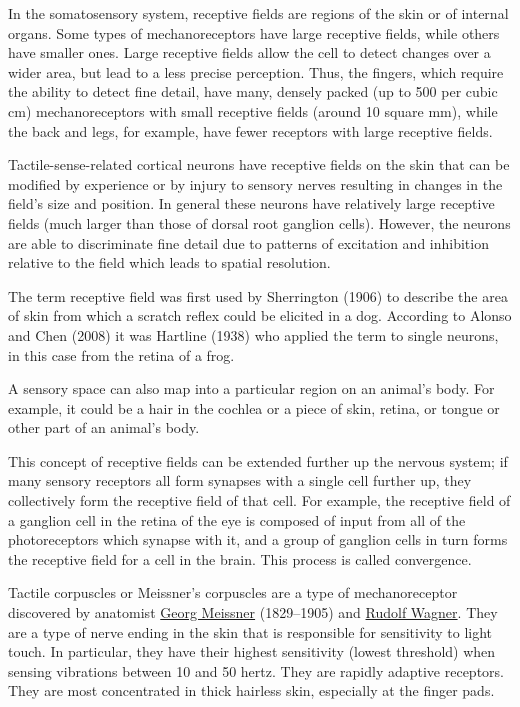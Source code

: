 In the somatosensory system, receptive fields are regions of the skin or of internal organs. Some types of mechanoreceptors have large receptive fields, while others have smaller ones. Large receptive fields allow the cell to detect changes over a wider area, but lead to a less precise perception. Thus, the fingers, which require the ability to detect fine detail, have many, densely packed (up to 500 per cubic cm) mechanoreceptors with small receptive fields (around 10 square mm), while the back and legs, for example, have fewer receptors with large receptive fields.

Tactile-sense-related cortical neurons have receptive fields on the skin that can be modified by experience or by injury to sensory nerves resulting in changes in the field's size and position. In general these neurons have relatively large receptive fields (much larger than those of dorsal root ganglion cells). However, the neurons are able to discriminate fine detail due to patterns of excitation and inhibition relative to the field which leads to spatial resolution.

The term receptive field was first used by Sherrington (1906) to describe the area of skin from which a scratch reflex could be elicited in a dog. According to Alonso and Chen (2008) it was Hartline (1938) who applied the term to single neurons, in this case from the retina of a frog.

A sensory space can also map into a particular region on an animal's body. For example, it could be a hair in the cochlea or a piece of skin, retina, or tongue or other part of an animal's body.

This concept of receptive fields can be extended further up the nervous system; if many sensory receptors all form synapses with a single cell further up, they collectively form the receptive field of that cell. For example, the receptive field of a ganglion cell in the retina of the eye is composed of input from all of the photoreceptors which synapse with it, and a group of ganglion cells in turn forms the receptive field for a cell in the brain. This process is called convergence.

Tactile corpuscles or Meissner's corpuscles are a type of mechanoreceptor discovered by anatomist \href{https://en.wikipedia.org/wiki/Georg_Meissner}{Georg Meissner} (1829--1905) and \href{https://en.wikipedia.org/wiki/Rudolf_Wagner}{Rudolf Wagner}. They are a type of nerve ending in the skin that is responsible for sensitivity to light touch. In particular, they have their highest sensitivity (lowest threshold) when sensing vibrations between 10 and 50 hertz. They are rapidly adaptive receptors. They are most concentrated in thick hairless skin, especially at the finger pads.

